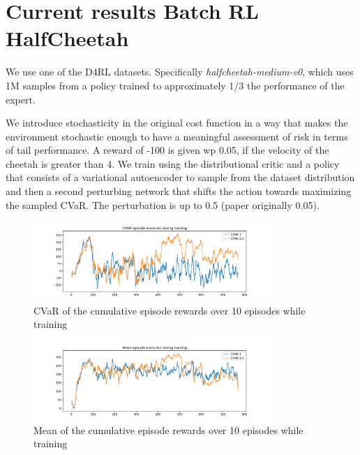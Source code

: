 
\section{Current results Batch RL HalfCheetah}
We use one of the D4RL datasets.
Specifically \textit{halfcheetah-medium-v0}, which uses 1M samples from a policy trained
to approximately 1/3 the performance of the expert.

We introduce stochasticity in the original cost function in a way that 
makes the environment stochastic enough to have a meaningful assessment of risk in terms of 
tail performance.
A reward of -100 is given wp 0.05, if the velocity of the cheetah is greater than 4.
We train using the distributional critic and a policy that consists of a variational autoencoder
to sample from the dataset distribution and then a second perturbing network that shifts the
action towards maximizing the sampled CVaR.
The perturbation is up to 0.5 (paper originally 0.05).

\begin{figure}[ht]
        \centering
        \includegraphics[width=0.8\textwidth]{images/Cheetah_offpolicy_medium/cvar_train.pdf}
        \caption{CVaR of the cumulative episode rewards over 10 episodes while training}
        \label{cvar_cheetah}
    
\end{figure}

\begin{figure}[ht]
    \centering
    \includegraphics[width=0.8\textwidth]{images/Cheetah_offpolicy_medium/mean_train.pdf}
    \caption{Mean of the cumulative episode rewards over 10 episodes while training}
    \label{mean_cheetah}

\end{figure}




